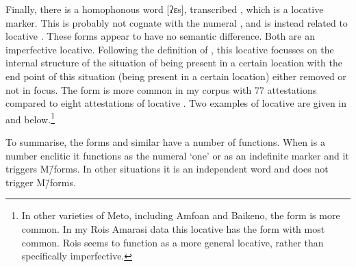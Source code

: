 Finally, there is a homophonous word [ʔɛs],
transcribed , which is a locative marker.
This  is probably not cognate with the numeral ,
and is instead related to locative .
These forms appear to have no semantic difference.
Both are an imperfective locative.
Following the definition of \citet[16]{co76},
this locative focusses on the internal structure of the situation of 
being present in a certain location with the end
point of this situation (being present in a certain location)
either removed or not in focus.
The form  is more common in my corpus with 77 attestations
compared to eight attestations of locative .
Two examples of locative  are given in
 and  below.\footnote{
		In other varieties of Meto, including Amfo{\Q}an and Baikeno,
		the form  is more common.
		In my Ro{\Q}is Amarasi data this locative
		has the form  with  most common.
		Ro{\Q}is  seems to function as a more
		general locative, rather than specifically imperfective.}

\begin{exe}
	\label{ex:130821-1, 0.38}
	\label{ex:130925-1, 1.24}
\end{exe}

To summarise, the forms  and similar  have a number of functions.
When  is a number enclitic it functions as the numeral `one'
or as an indefinite marker and it triggers M\=/forms.
In other situations it is an independent word and does not trigger M\=/forms.